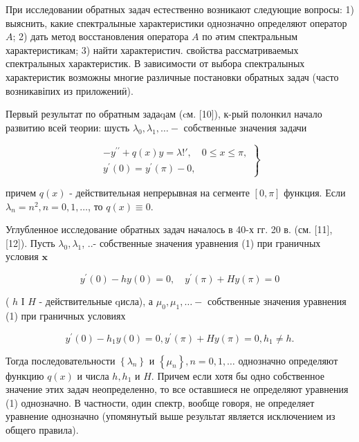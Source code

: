 \documentclass[10pt]{article}
\begin{document}
При исследовании обратных задач естественно возникают следующие вопросы: 1) выяснить, какие спектралыные характеристики однозначно определяют оператор $A$; 2) дать метод восстановления оператора $A$ по әтим спектральным характеристикам; 3) найти характеристич. свойства рассматриваемых спектралыных характеристик. В зависимости от выбора спектралыных характеристик возможны многие различные постановки обратных задач (часто возникавіпих из приложениӥ).



Первый резулытат по обратным задаqам (cм. [10]), к-рый полонкил начало развитию всей теории: шусть $\lambda_{0}, \lambda_{1}, \ldots-$ собственные значения задачи



\[

\left.\begin{array}{l}

-y^{\prime \prime}+q(x) y=\lambda ! \prime, \quad 0 \leqslant x \leqslant \pi, \\

y^{\prime}(0)=y^{\prime}(\pi)-0,

\end{array}\right\}

\]



причем $q(x)$ - действительная непрерывная на сегменте $[0, \pi]$ функция. Если $\lambda_{n}=n^{2}, n=0,1, \ldots$, то $q(x) \equiv 0$.



Углубленное исследование обратных задач началось в 40-х гг. 20 в. (см. [11], [12]). Пусть $\lambda_{0}, \lambda_{1}$, ..- собственные значения уравнения (1) при граничных условия $\mathbf{x}$



\[

y^{\prime}(0)-h y(0)=0, \quad y^{\prime}(\pi)+H y(\pi)=0

\]



( $h$ І $H$ - действительные qисла), а $\mu_{0}, \mu_{1}, \ldots-$ собственные значения уравнения (1) при граничных условиях



\[

y^{\prime}(0)-h_{1} y(0)=0, y^{\prime}(\pi)+H y(\pi)=0, h_{1} \neq h .

\]



Тогда последовательности $\left\{\lambda_{n}\right\}$ и $\left\{\mu_{n}\right\}, n=0,1, \ldots$ однозначно определяют функцию $q(x)$ и числа $h, h_{1}$ и $H$. Причем если хотя бы одно собственное значение этих задач неопределенно, то все оставшиеся не определяют уравнения (1) однозначно. В частности, один спектр, вообще говоря, не определяет уравнение однозначно (упомянутый выше результат является исключением из общего правила).
\end{document}
